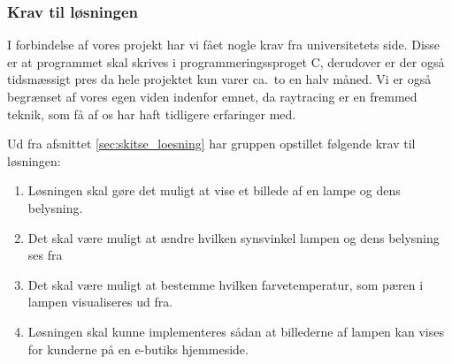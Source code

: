 \subsubsection{Krav til løsningen}

I forbindelse af vores projekt har vi fået nogle krav fra universitetets side. Disse er at programmet skal skrives i programmeringssproget C, derudover er der også tidsmæssigt pres da hele projektet kun varer ca.\ to en halv måned. 
Vi er også begrænset af vores egen viden indenfor emnet, da raytracing er en fremmed teknik, som få af os har haft tidligere erfaringer med. 

Ud fra afsnittet \ref{sec:skitse_loesning} har gruppen opstillet følgende krav til løsningen:
\begin{enumerate}
    \item Løsningen skal gøre det muligt at vise et billede af en lampe og dens belysning.
    \item Det skal være muligt at ændre hvilken synsvinkel lampen og dens belysning ses fra
    \item Det skal være muligt at bestemme hvilken farvetemperatur, som pæren i lampen visualiseres ud fra.
    \item Løsningen skal kunne implementeres sådan at billederne af lampen kan vises for kunderne på en e-butiks hjemmeside.
\end{enumerate}
